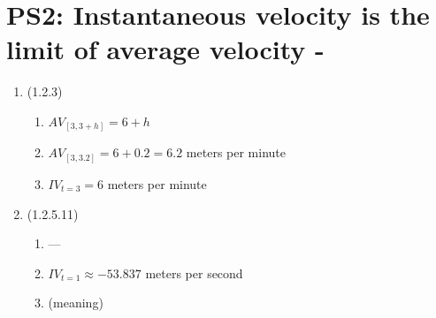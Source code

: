 


%


\allowdisplaybreaks
\section{PS2: Instantaneous velocity is the limit of average velocity  -  }


\everymath{\displaystyle}
\begin{enumerate}[leftmargin=0pt]

\item (1.2.3)
\begin{enumerate}
    \item $AV_{[3, 3+h]} = 6 + h$
    \item $AV_{[3, 3.2]} = 6 + 0.2 = 6.2$ meters per minute
    \item $IV_{t=3} = 6$ meters per minute
\end{enumerate}

\item (1.2.5.11)
\begin{enumerate}
    \item ---
    \item $IV_{t=1} \approx -53.837$ meters per second
    \item (meaning)
\end{enumerate}


\end{enumerate}
